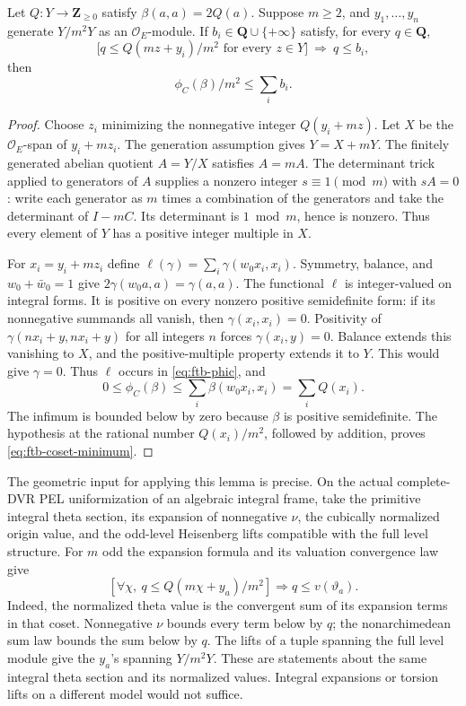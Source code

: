 \begin{srlemma}\label{lem:ftb-coset-minimum}
Let \(Q:Y\to\mathbf Z_{\geq0}\) satisfy
\(\beta(a,a)=2Q(a)\).  Suppose \(m\geq2\), and
\(y_1,\ldots,y_n\) generate \(Y/m^2Y\) as an
\(\mathcal O_E\)-module.  If \(b_i\in\mathbf Q\cup\{+\infty\}\)
satisfy, for every \(q\in\mathbf Q\),
\[
 \bigl[q\leq Q(mz+y_i)/m^2\text{ for every }z\in Y\bigr]
       \ \Longrightarrow\ q\leq b_i,
\]
then
\[
                 \phi_C(\beta)/m^2\leq\sum_i b_i .
 \tag{C5}\label{eq:ftb-coset-minimum}
\]
\end{srlemma}
\begin{proof}
Choose \(z_i\) minimizing the nonnegative integer
\(Q(y_i+mz)\).  Let \(X\) be the \(\mathcal O_E\)-span of
\(y_i+mz_i\).  The generation assumption gives \(Y=X+mY\).
The finitely generated abelian quotient \(A=Y/X\) satisfies \(A=mA\).
The determinant trick applied to generators of \(A\) supplies a
nonzero integer \(s\equiv1\pmod m\) with \(sA=0\):
write each generator as \(m\) times a combination of the generators
and take the determinant of \(I-mC\).  Its determinant is
\(1\bmod m\), hence is nonzero.  Thus every element of \(Y\) has a
positive integer multiple in \(X\).

For \(x_i=y_i+mz_i\) define
\(\ell(\gamma)=\sum_i\gamma(w_0x_i,x_i)\).
Symmetry, balance, and \(w_0+\bar w_0=1\) give
\(2\gamma(w_0a,a)=\gamma(a,a)\).
The functional \(\ell\) is integer-valued on integral forms.
It is positive on every nonzero positive semidefinite form:
if its nonnegative summands all vanish, then
\(\gamma(x_i,x_i)=0\).  Positivity of
\(\gamma(nx_i+y,nx_i+y)\) for all integers \(n\) forces
\(\gamma(x_i,y)=0\).  Balance extends this vanishing to \(X\), and
the positive-multiple property extends it to \(Y\).  This would give
\(\gamma=0\).  Thus \(\ell\) occurs in \eqref{eq:ftb-phic}, and
\[
 0\leq\phi_C(\beta)
 \leq\sum_i\beta(w_0x_i,x_i)=\sum_iQ(x_i).
\]
The infimum is bounded below by zero because \(\beta\) is
positive semidefinite.  The hypothesis at the rational number
\(Q(x_i)/m^2\), followed by addition, proves \eqref{eq:ftb-coset-minimum}.
\end{proof}

The geometric input for applying this lemma is precise.  On the actual
complete-DVR PEL uniformization of an algebraic integral frame, take
the primitive integral theta section, its expansion of nonnegative
\(\nu\), the cubically normalized origin value, and the odd-level
Heisenberg lifts compatible with the full level structure.
For \(m\) odd the expansion formula and its valuation convergence law
give
\[
 \left[\forall\chi,\ q\leq
      Q(m\chi+y_a)/m^2\right]
       \Longrightarrow q\leq v(\vartheta_a) .
 \tag{C6}\label{eq:ftb-theta-coset-val}
\]
Indeed, the normalized theta value is the convergent sum of its
expansion terms in that coset.  Nonnegative \(\nu\) bounds every
term below by \(q\); the nonarchimedean sum law bounds the sum below
by \(q\).  The lifts of a tuple spanning the full level module
give the \(y_a\)'s spanning \(Y/m^2Y\).
These are statements about the same integral theta section and its
normalized values.  Integral expansions or torsion lifts on a
different model would not suffice.

